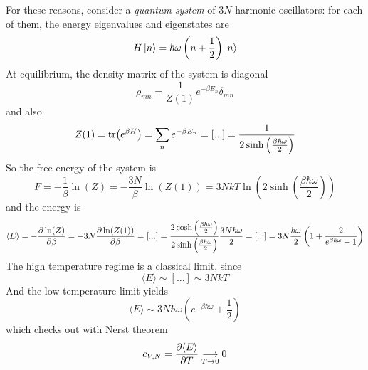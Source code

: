 For these reasons, consider a \textit{quantum system} of $3N$ harmonic
oscillators: for each of them, the energy eigenvalues and eigenstates are
\[
    H\ket{n} = \hbar \omega \left(n+\frac{1}{2}\right)\ket{n}
\]
At equilibrium, the density matrix of the system is diagonal
\[
    \rho_{mn} = \frac{1}{Z(1)}e^{-\beta E_n}\delta_{mn}
\]
and also
\[
    Z(1) = \tr(e^{\beta H}) = \sum_{n}^{} e^{-\beta E_n}=[...]=\frac{1}{2\sinh
    \left(\frac{\beta \hbar \omega }{2}\right)}
\]
So the free energy of the system is
\[
    F = -\frac{1}{\beta}\ln(Z) = -\frac{3N}{\beta }\ln(Z(1)) = 3NkT\ln\left(
    2\sinh\left(\frac{\beta \hbar \omega }{2}\right)\right) 
\]
and the energy is
\[
    \langle E\rangle =-\pdv{\ln(Z)}{\beta} = -3N\pdv{\ln(Z(1))}{\beta} = 
    [...]=\frac{2\cosh\left(\frac{\beta \hbar \omega }{2}\right)}{
        2\sinh\left(\frac{\beta \hbar \omega}{2}\right)}\frac{3N\hbar \omega}{2}=
        [...]=3N\frac{\hbar \omega }{2}\left(1+\frac{2}{e^{\beta\hbar\omega }-1}
        \right)
\]
The high temperature regime is a classical limit, since
\[
    \langle E\rangle \sim [...] \sim 3NkT
\]
And the low temperature limit yields
\[
    \langle E\rangle \sim 3N\hbar \omega\left( e^{-\beta \hbar \omega }+
    \frac{1}{2}\right) 
\]
which checks out with Nerst theorem
\[
    c_{V,N}=\pdv{\langle E\rangle }{T}\underset{T\to0}\longrightarrow 0
\]
